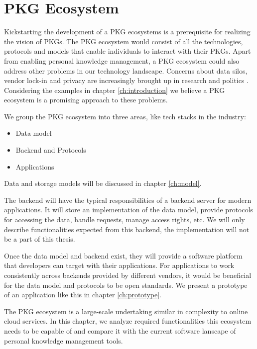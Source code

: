 \chapter{PKG Ecosystem} \label{ch:ecosystem}

Kickstarting the development of a PKG ecosystems is a prerequisite for realizing the vision of PKGs. The PKG ecosystem would consist of all the technologies, protocols and models that enable individuals to interact with their PKGs. Apart from enabling personal knowledge management, a PKG ecosystem could also address other problems in our technology landscape. Concerns about data silos, vendor lock-in and privacy are increasingly brought up in research and politics \cite{missingCitation}. Considering the examples in chapter \ref{ch:introduction} we believe a PKG ecosystem is a promising approach to these problems.

We group the PKG ecosystem into three areas, like tech stacks in the industry:

\begin{itemize}
    \item Data model
    \item Backend and Protocols
    \item Applications
\end{itemize}

Data and storage models will be discussed in chapter \ref{ch:model}.

The backend will have the typical responsibilities of a backend server for modern applications. It will store an implementation of the data model, provide protocols for accessing the data, handle requests, manage access rights, etc.
We will only describe functionalities expected from this backend, the implementation will not be a part of this thesis.

Once the data model and backend exist, they will provide a software platform that developers can target with their applications. For applications to work consistently across backends provided by different vendors, it would be beneficial for the data model and protocols to be open standards.
We present a prototype of an application like this in chapter \ref{ch:prototype}.

The PKG ecosystem is a large-scale undertaking similar in complexity to online cloud services. In this chapter, we analyze required functionalities this ecosystem needs to be capable of and compare it with the current software lanscape of personal knowledge management tools.

